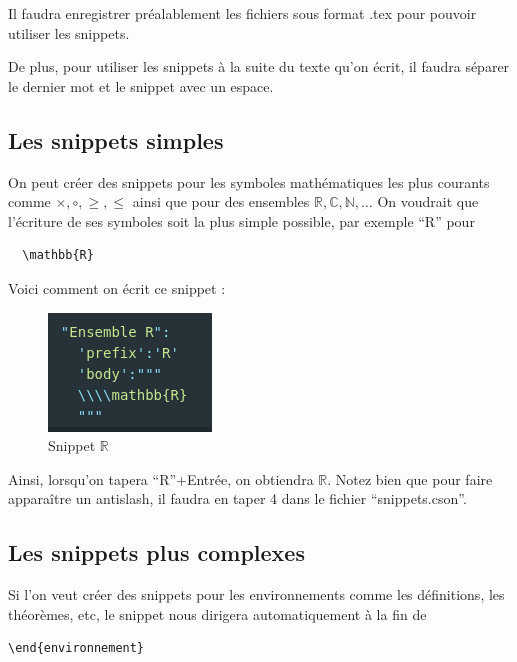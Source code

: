 \documentclass[french]{article}
\theoremstyle{definition}
\theoremstyle{remark}
\begin{document}
{\selectfont{}\relax} Il faudra enregistrer préalablement les fichiers sous format .tex pour pouvoir utiliser les snippets.

De plus, pour utiliser les snippets à la suite du texte qu'on écrit, il faudra séparer le dernier mot et le snippet avec un espace.


\subsection{Les snippets simples}

On peut créer des snippets pour les symboles mathématiques les plus courants  comme \(\times, \circ, \geq, \leq \) ainsi que pour des ensembles \(\mathbb{R}, \mathbb{C}, \mathbb{N}, \dots\) On voudrait que l'écriture de ses symboles soit la plus simple possible, par exemple ``R'' pour \begin{verbatim}
  \mathbb{R}
\end{verbatim}

Voici comment on écrit ce snippet :

\begin{figure}[h!]
  \centering
  \includegraphics[scale=0.5]{fig/snipr.png}
  \caption{Snippet \(\mathbb{R}\)}
  \label{}
\end{figure}

Ainsi, lorsqu'on tapera ``R''+Entrée, on obtiendra \(\mathbb{R}\). Notez bien que pour faire apparaître un antislash, il faudra en taper 4 dans le fichier ``snippets.cson''.

\subsection{Les snippets plus complexes}

Si l'on veut créer des snippets pour les environnements comme les définitions, les théorèmes, etc, le snippet nous dirigera automatiquement à la fin de

\begin{verbatim}
\end{environnement}
\end{verbatim}
\end{document}
